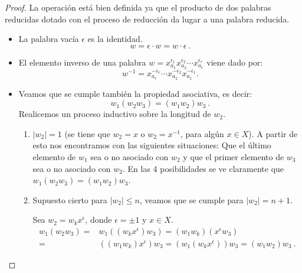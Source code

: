 \begin{proof}

La operación está bien definida ya que el producto de dos palabras reducidas dotado con el proceso de reducción da lugar a una palabra reducida.
\begin{itemize}
    \item La palabra vacía $\epsilon$ es la identidad.
    \[
        w = \epsilon \cdot w = w \cdot \epsilon \: .
    \]
    \item El elemento inverso de una palabra $w = x_{a_1}^{\epsilon_1} x_{a_2}^{\epsilon_2} \cdots x_{a_r}^{\epsilon_r} $ viene dado por:
    \[w^{-1} = x_{a_r}^{-\epsilon_r} \cdots x_{a_2}^{-\epsilon_2} x_{a_1}^{-\epsilon_1} .
    \]
    \item Veamos que se cumple también la propiedad asociativa, es decir:
    \[
        w_1(w_2w_3)=(w_1w_2)w_3 \:.
    \]
    Realicemos un proceso inductivo sobre la longitud de $w_2$.
    \begin{enumerate}
        \item $|w_2|=1$ (se tiene que $w_2=x$ o $w_2=x^{-1}$, para algún $x\in X$). A partir de esto nos encontramos con las siguientes situaciones: Que el último elemento de $w_1$ sea o no asociado con $w_2$ y que el primer elemento de $w_3$ sea o no asociado con $w_2$.
        En las 4 posibilidades se ve claramente que $w_1(w_2w_3) = (w_1w_2)w_3$.
        
        \item Supuesto cierto para $|w_2|\leq n$, veamos que se cumple para $|w_2|=n+1$.
        
        Sea $w_2=w_k x^{\epsilon}$, donde $\epsilon=\pm 1$ y $x \in X$.
        \begin{align*}
            w_1(w_2w_3) = & w_1((w_kx^{\epsilon})w_3) = (w_1w_k)(x^{\epsilon}w_3) \\ =&((w_1w_k)x^{\epsilon})w_3 = (w_1(w_kx^{\epsilon}))w_3 = (w_1w_2)w_3 \: .
        \end{align*}
    \end{enumerate}
\end{itemize}
\end{proof}





